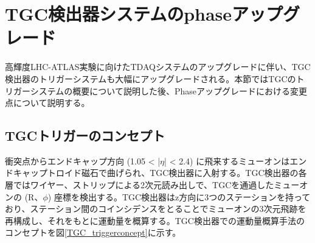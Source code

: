 \section{TGC検出器システムのphase\two アップグレード}
\label{sec_TGCtrigger}
高輝度LHC-ATLAS実験に向けたTDAQシステムのアップグレードに伴い、TGC検出器のトリガーシステムも大幅にアップグレードされる。本節ではTGCのトリガーシステムの概要について説明した後、Phase\two アップグレードにおける変更点について説明する。

    \subsection{TGCトリガーのコンセプト}
    \label{subsec_trigger_concept}
衝突点からエンドキャップ方向  (1.05 < |$\eta$| < 2.4) に飛来するミューオンはエンドキャップトロイド磁石で曲げられ、TGC検出器に入射する。TGC検出器の各層ではワイヤー、ストリップによる2次元読み出しで、TGCを通過したミューオンの  (R、$\phi$) 座標を検出する。TGC検出器はz方向に3つのステーションを持っており、ステーション間のコインシデンスをとることでミューオンの3次元飛跡を再構成し、それをもとに運動量を概算する。TGC検出器での運動量概算手法のコンセプトを図\ref{TGC_triggerconcept}に示す。

